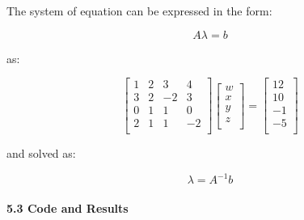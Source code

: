 \documentclass[11pt]{article}
\begin{document}
The system of equation can be expressed in the form:

\[\begin{equation}
    A \lambda = b
\end{equation}\]

as:

\[\begin{equation}
    \begin{bmatrix}
        1&2&3&4\\
        3&2&-2&3\\
        0&1&1&0\\
        2&1&1&-2\\
    \end{bmatrix} \begin{bmatrix}
    w\\
    x\\
    y\\
    z\\
    \end{bmatrix} = \begin{bmatrix}
        12\\
        10\\
        -1\\
        -5\\
    \end{bmatrix}
\end{equation}\]

and solved as:

\[\begin{equation}
    \lambda = A^{-1}b
\end{equation}\]

\hypertarget{code-and-results}{%
\paragraph{5.3 \textbar{} Code and Results}\label{code-and-results}}
\end{document}
